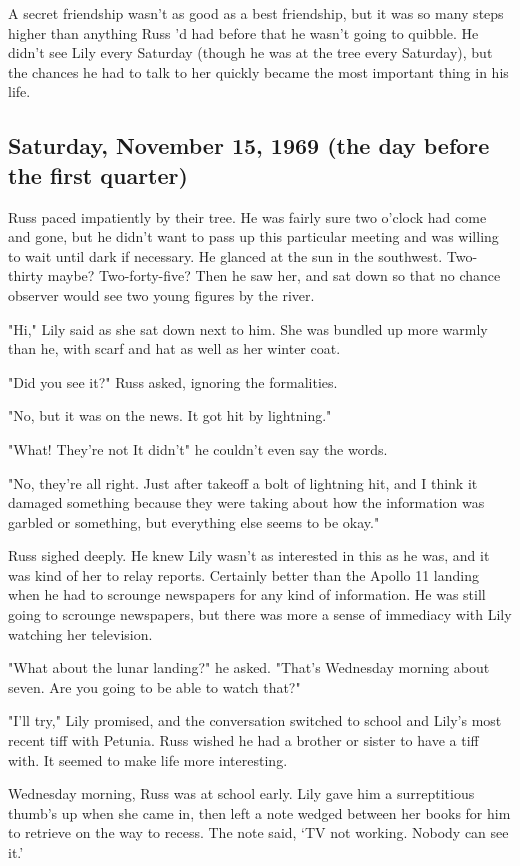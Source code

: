 A secret friendship wasn't as good as a best friendship, but it was so many steps higher than anything Russ 'd had before that he wasn't going to quibble. He didn't see Lily every Saturday (though he was at the tree every Saturday), but the chances he had to talk to her quickly became the most important thing in his life.

\subsection{Saturday, November 15, 1969 (the day before the first quarter)}

Russ paced impatiently by their tree. He was fairly sure two o'clock had come and gone, but he didn't want to pass up this particular meeting and was willing to wait until dark if necessary. He glanced at the sun in the southwest. Two-thirty maybe? Two-forty-five? Then he saw her, and sat down so that no chance observer would see two young figures by the river.

"Hi," Lily said as she sat down next to him. She was bundled up more warmly than he, with scarf and hat as well as her winter coat.

"Did you see it?" Russ asked, ignoring the formalities.

"No, but it was on the news. It got hit by lightning."

"What! They're not{\el} It didn't{\el}" he couldn't even say the words.

"No, they're all right. Just after takeoff a bolt of lightning hit, and I think it damaged something because they were taking about how the information was garbled or something, but everything else seems to be okay."

Russ sighed deeply. He knew Lily wasn't as interested in this as he was, and it was kind of her to relay reports. Certainly better than the Apollo 11 landing when he had to scrounge newspapers for any kind of information. He was still going to scrounge newspapers, but there was more a sense of immediacy with Lily watching her television.

"What about the lunar landing?" he asked. "That's{\el} Wednesday morning about seven. Are you going to be able to{\el} watch that?"

"I'll try," Lily promised, and the conversation switched to school and Lily's most recent tiff with Petunia. Russ wished he had a brother or sister to have a tiff with. It seemed to make life more interesting.

Wednesday morning, Russ was at school early. Lily gave him a surreptitious thumb's up when she came in, then left a note wedged between her books for him to retrieve on the way to recess. The note said, `TV not working. Nobody can see it.'

